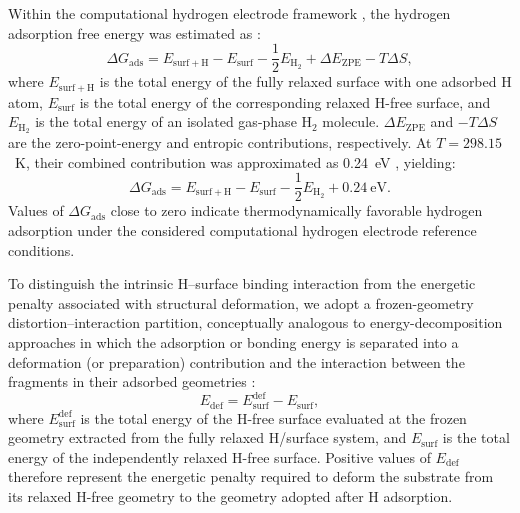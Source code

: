 \documentclass[journal=jacsat,manuscript=article]{achemso}
\begin{document}
Within the computational hydrogen electrode framework \cite{NORSKOV2004}, the hydrogen adsorption free energy was estimated as \cite{Liao2022,Sholl2009DensityTheory,Martin2004ElectronicMethods}:
\begin{equation}
    \Delta G_{\mathrm{ads}}
    =
    E_{\mathrm{surf+H}}
    -
    E_{\mathrm{surf}}
    -
    \frac{1}{2}E_{\mathrm{H_2}}
    +
    \Delta E_{\mathrm{ZPE}}
    -
    T\Delta S,
    \label{eq:Gads}
\end{equation}
where $E_{\mathrm{surf+H}}$ is the total energy of the fully relaxed surface with one adsorbed H atom, $E_{\mathrm{surf}}$ is the total energy of the corresponding relaxed H-free surface, and $E_{\mathrm{H_2}}$ is the total energy of an isolated gas-phase H$_2$ molecule. $\Delta E_{\mathrm{ZPE}}$ and $-T\Delta S$ are the zero-point-energy and entropic contributions, respectively. At $T=298.15$~K, their combined contribution was approximated as 0.24~eV \cite{Norskov_2005}, yielding:
\begin{equation}
    \Delta G_{\mathrm{ads}}
    =
    E_{\mathrm{surf+H}}
    -
    E_{\mathrm{surf}}
    -
    \frac{1}{2}E_{\mathrm{H_2}}
    +
    0.24~\mathrm{eV}.
    \label{eq:Gads_approx}
\end{equation}
Values of $\Delta G_{\mathrm{ads}}$ close to zero indicate thermodynamically favorable hydrogen adsorption under the considered computational hydrogen electrode reference conditions.

To distinguish the intrinsic H--surface binding interaction from the
energetic penalty associated with structural deformation, we adopt a
frozen-geometry distortion--interaction partition, conceptually
analogous to energy-decomposition approaches in which the adsorption
or bonding energy is separated into a deformation (or preparation)
contribution and the interaction between the fragments in their
adsorbed geometries \cite{Raupach2015,Staub2019,Clabaut2020}:
\begin{equation}
    E_{\mathrm{def}}=E_{\mathrm{surf}}^{\mathrm{def}}-E_{\mathrm{surf}},
    \label{eq:Edef}
\end{equation}
where $E_{\mathrm{surf}}^{\mathrm{def}}$ is the total energy of the H-free surface evaluated at the frozen geometry extracted from the fully relaxed H/surface system, and $E_{\mathrm{surf}}$ is the total energy of the independently relaxed H-free surface. Positive values of $E_{\mathrm{def}}$ therefore represent the energetic penalty required to deform the substrate from its relaxed H-free geometry to the geometry adopted after H adsorption.
\end{document}
